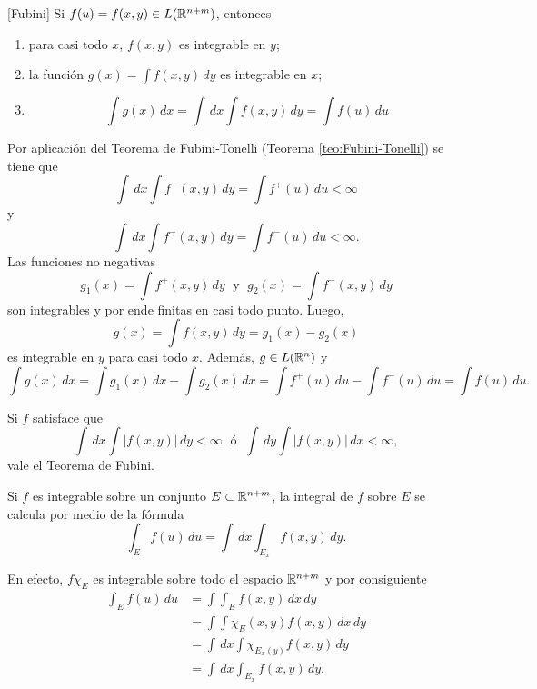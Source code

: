         \begin{teorema}{}[Fubini]
        Si $f(u)=f(x,y) \in L(\mathbb{R}^{n+m})$, entonces
        \begin{enumerate}
            \item para casi todo $x$, $f(x,y)$ es integrable en $y$;
            \item la funci\'on $g(x)=\int f(x,y)\,dy$ es integrable en $x$;
            \item \[
            \int g(x)\,dx=\int \,dx \int f(x,y)\,dy=\int f(u)\,du
            \]
        \end{enumerate}
                \end{teorema}
               
                
                \begin{demo}
                 Por aplicaci\'on del Teorema de Fubini-Tonelli (Teorema \ref{teo:Fubini-Tonelli}) se tiene que 
                 \[
                 \int\,dx \int f^{+}(x,y)\,dy=\int f^{+}(u)\,du<\infty
                 \]
                 y 
                 \[
                  \int\,dx \int f^{-}(x,y)\,dy=\int f^{-}(u)\,du<\infty.
                 \]
                 Las funciones no negativas
\[
g_1(x)=\int f^{+}(x,y)\,dy\; \mbox{ y }\; 
g_2(x)=\int f^{-}(x,y)\,dy
\]
son integrables y por ende finitas en casi todo punto. 
Luego, 
\[g(x)=\int f(x,y)\,dy=g_1(x)-g_2(x)
\]
es integrable en $y$ para casi todo $x$. Adem\'as, $g \in L(\mathbb{R}^n)$ y 
\[
\int g(x)\,dx=\int g_1(x)\,dx - \int g_2(x)\,dx=\int f^{+}(u)\,du - \int f^{-}(u)\,du=\int f(u)\,du.
\]
                \end{demo}
                
                \begin{corolario}{}
Si $f$ satisface que 
\[
\int\,dx \int |f(x,y)|\,dy<\infty\; \mbox{ \'o }\;
\int\,dy \int |f(x,y)|\,dx<\infty,
\]
vale el Teorema de Fubini.
\end{corolario}
        
        
Si $f$ es integrable sobre un conjunto $E\subset \mathbb{R}^{n+m}$, la integral de $f$ sobre $E$ se calcula por medio de la f\'ormula
\[
\int_E f(u)\,du=\int\,dx \int_{E_x} f(x,y)\,dy.
\]

En efecto, $f\chi_E$ es integrable sobre todo el espacio $\mathbb{R}^{n+m}$ y por consiguiente
\[
\begin{split}
\int_E f(u)\,du &=\int\int_E f(x,y)\,dx\,dy
\\
&=\int\int \chi_E(x,y)f(x,y)\,dx\,dy
\\
&=\int\,dx\int \chi_{E_x(y)}f(x,y)\,dy
\\
&=\int\,dx\int_{E_x} f(x,y)\,dy.
\end{split}
\]
